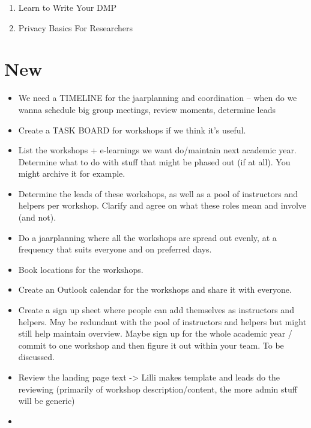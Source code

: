 \documentclass[
  letterpaper,
  DIV=11,
  numbers=noendperiod]{scrreprt}
\providecommand{\tightlist}{%
  \setlength{\itemsep}{0pt}\setlength{\parskip}{0pt}}\usepackage{longtable,booktabs,array}
\begin{document}

\begin{enumerate}
\def\labelenumi{\arabic{enumi}.}
\item
  Learn to Write Your DMP
\item
  Privacy Basics For Researchers
\end{enumerate}


\chapter*{New}\label{new-1}


\begin{itemize}
\tightlist
\item
  We need a TIMELINE for the jaarplanning and coordination -- when do we
  wanna schedule big group meetings, review moments, determine leads 🎉
\item
  Create a TASK BOARD for workshops if we think it's useful.
\item
  List the workshops + e-learnings we want do/maintain next academic
  year. Determine what to do with stuff that might be phased out (if at
  all). You might archive it for example.
\item
  Determine the leads of these workshops, as well as a pool of
  instructors and helpers per workshop. Clarify and agree on what these
  roles mean and involve (and not).
\item
  Do a jaarplanning where all the workshops are spread out evenly, at a
  frequency that suits everyone and on preferred days.
\item
  Book locations for the workshops.
\item
  Create an Outlook calendar for the workshops and share it with
  everyone.
\item
  Create a sign up sheet where people can add themselves as instructors
  and helpers. May be redundant with the pool of instructors and helpers
  but might still help maintain overview. Maybe sign up for the whole
  academic year / commit to one workshop and then figure it out within
  your team. To be discussed.
\item
  Review the landing page text -\textgreater{} Lilli makes template and
  leads do the reviewing (primarily of workshop description/content, the
  more admin stuff will be generic)
\item

\end{itemize}
\end{document}
